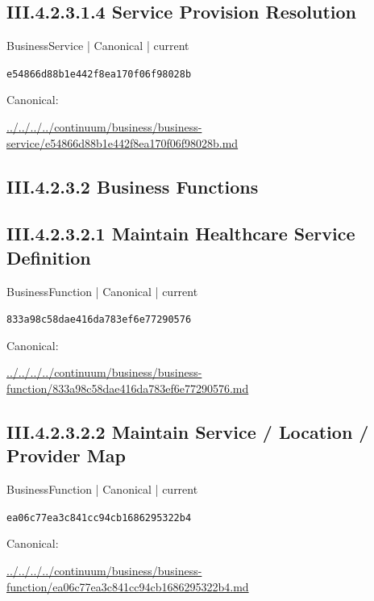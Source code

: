 \documentclass[10pt,a4paper]{article}
\begin{document}
\subsection*{III.4.2.3.1.4 Service Provision Resolution}
\label{element-e54866d88b1e442f8ea170f06f98028b}
{\small BusinessService | Canonical | current}\par
\texttt{e54866d88b1e442f8ea170f06f98028b}\par
Canonical: \par
{\footnotesize\url{../../../../continuum/business/business-service/e54866d88b1e442f8ea170f06f98028b.md}}\par
\subsection*{III.4.2.3.2 Business Functions}
\subsection*{III.4.2.3.2.1 Maintain Healthcare Service Definition}
\label{element-833a98c58dae416da783ef6e77290576}
{\small BusinessFunction | Canonical | current}\par
\texttt{833a98c58dae416da783ef6e77290576}\par
Canonical: \par
{\footnotesize\url{../../../../continuum/business/business-function/833a98c58dae416da783ef6e77290576.md}}\par
\subsection*{III.4.2.3.2.2 Maintain Service / Location / Provider Map}
\label{element-ea06c77ea3c841cc94cb1686295322b4}
{\small BusinessFunction | Canonical | current}\par
\texttt{ea06c77ea3c841cc94cb1686295322b4}\par
Canonical: \par
{\footnotesize\url{../../../../continuum/business/business-function/ea06c77ea3c841cc94cb1686295322b4.md}}\par
\end{document}

